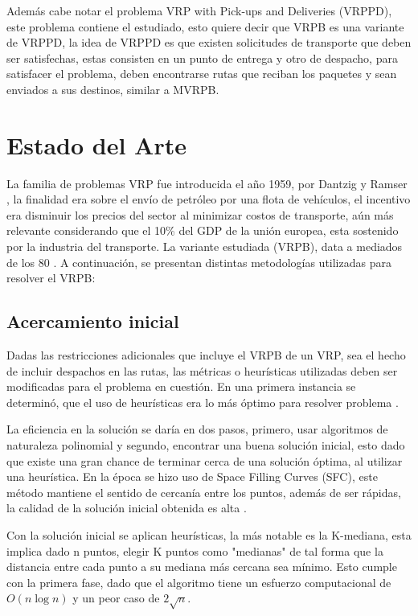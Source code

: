 \documentclass[letter, 10pt]{article}
\begin{document}
Además cabe notar el problema VRP with Pick-ups and Deliveries (VRPPD)\cite{desaulniers2002vrp}, este problema contiene el estudiado, esto quiere decir que VRPB es una variante de VRPPD, la idea de VRPPD es que existen solicitudes de transporte que deben ser satisfechas, estas consisten en un punto de entrega y otro de despacho, para satisfacer el problema, deben encontrarse rutas que reciban los paquetes y sean enviados a sus destinos, similar a MVRPB.

\section{Estado del Arte}
La familia de problemas VRP fue introducida el año 1959, por Dantzig y Ramser \cite{bernard1959truck}, la finalidad era sobre el envío de petróleo por una flota de vehículos, el incentivo era disminuir los precios del sector al minimizar costos de transporte, aún más relevante considerando que el 10\% del GDP de la unión europea, esta sostenido por la industria del transporte\cite{hasle2007geometric}. La variante estudiada (VRPB), data a mediados de los 80 \cite{golden1985vehicle}. A continuación, se presentan distintas metodologías utilizadas para resolver el VRPB:
\subsection{Acercamiento inicial}
Dadas las restricciones adicionales que incluye el VRPB de un VRP, sea el hecho de incluir despachos en las rutas, las métricas o heurísticas utilizadas deben ser modificadas para el problema en cuestión. En una primera instancia se determinó, que el uso de heurísticas era lo más óptimo para resolver problema \cite{goetschalckx1989vehicle}.

La eficiencia en la solución se daría en dos pasos, primero, usar algoritmos de naturaleza polinomial y segundo, encontrar una buena solución inicial, esto dado que existe una gran chance de terminar cerca de una solución óptima, al utilizar una heurística. En la época se hizo uso de Space Filling Curves (SFC), este método mantiene el sentido de cercanía entre los puntos, además de ser rápidas, la calidad de la solución inicial obtenida es alta \cite{bartholdi1988heuristics}.

Con la solución inicial se aplican heurísticas, la más notable es la K-mediana, esta implica dado n puntos, elegir K puntos como "medianas" de tal forma que la distancia entre cada punto a su mediana más cercana sea mínimo. Esto cumple con la primera fase, dado que el algoritmo tiene un esfuerzo computacional de $O(n \log n)$ y un peor caso de $2\sqrt{n}$.
\end{document}
